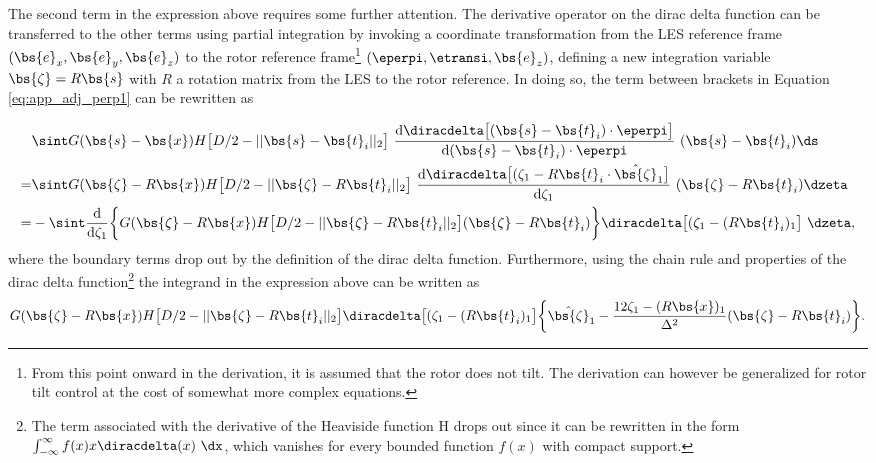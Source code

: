 The second term in the expression above requires some further attention. The derivative operator on the dirac delta function can be transferred to the other terms using partial integration by invoking a coordinate transformation from  the LES reference frame $(\bs{e}_x, \bs{e}_y, \bs{e}_z)$ to the rotor reference frame\footnote{From this point onward in the derivation, it is assumed that the rotor does not tilt. The derivation can however be generalized for rotor tilt control at the cost of somewhat more complex equations.} $(\eperpi, \etransi, \bs{e}_z)$, defining a new integration variable $\bs{\zeta} = R\bs{s}$ with $R$ a rotation matrix from the LES to the rotor reference. In doing so, the term between brackets in Equation \eqref{eq:app_adj_perp1} can be rewritten as 

\begin{align}
	&\sint G(\bs{s} - \bs{x})  H\big[D/2 - \vert\vert \bs{s} - \bs{t}_i \vert\vert_2 \big]~\frac{\text{d}\diracdelta\big[(\bs{s} - \bs{t}_i) \cdot \eperpi \big]}{\text{d} (\bs{s} - \bs{t}_i) \cdot \eperpi}~(\bs{s} - \bs{t}_i)  \ds \label{eq:app_adj_der_partial}\\
	= &\sint G(\bs{\zeta} - R\bs{x})  H\big[D/2 - \vert\vert \bs{\zeta} - R\bs{t}_i \vert\vert_2 \big]~\frac{\text{d}\diracdelta\big[(\zeta_1 - R\bs{t}_i \cdot \hat{\bs{\zeta}}_1 \big]}{\text{d}\zeta_1}~(\bs{\zeta} - R\bs{t}_i) \dzeta \nonumber\\
	= & - \sint \frac{\text{d}}{\text{d}\zeta_1} \bigg\{ G(\bs{\zeta} - R\bs{x})  H\big[D/2 - \vert\vert \bs{\zeta} - R\bs{t}_i \vert\vert_2 \big] (\bs{\zeta} - R\bs{t}_i)  \bigg\} \diracdelta\big[(\zeta_1 - (R\bs{t}_i)_1 \big]~ \dzeta,
\end{align}
where the boundary terms drop out by the definition of the dirac delta function. Furthermore, using the chain rule and properties of the dirac delta function\footnote{The term associated with the derivative of the Heaviside function H drops out since it can be rewritten in the form $\int_{-\infty}^{\infty} f(x) x \diracdelta(x)\ \dx$, which vanishes for every bounded function $f(x)$ with compact support.} the integrand in the expression above can be written as
{\small
\begin{align*}
	 G(\bs{\zeta} - R\bs{x})  H\big[D/2 - \vert\vert \bs{\zeta} - R\bs{t}_i \vert\vert_2 \big] \diracdelta\big[(\zeta_1 - (R\bs{t}_i)_1 \big] \bigg\{ \hat{\bs{\zeta}}_1 - \frac{12 \zeta_1 - (R\bs{x})_1}{\Delta^2} (\bs{\zeta} - R \bs{t}_i) \bigg\}.
\end{align*}}

